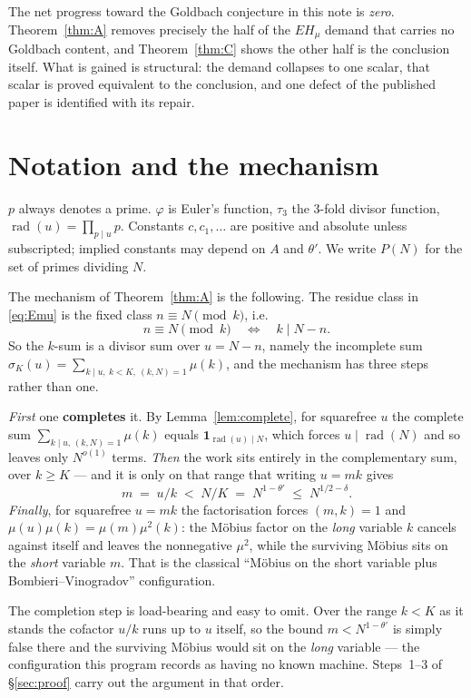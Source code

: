 \documentclass[11pt,a4paper]{article}
\theoremstyle{plain}
\theoremstyle{definition}
\DeclareMathOperator{\rad}{rad}
\begin{document}
The net progress toward the Goldbach conjecture in this note is
\emph{zero}. Theorem~\ref{thm:A} removes precisely the half of the
$EH_\mu$ demand that carries no Goldbach content, and
Theorem~\ref{thm:C} shows the other half is the conclusion itself. What
is gained is structural: the demand collapses to one scalar, that
scalar is proved equivalent to the conclusion, and one defect of the
published paper is identified with its repair.

\section{Notation and the mechanism}\label{sec:mechanism}

$p$ always denotes a prime. $\varphi$ is Euler's function, $\tau_3$ the
$3$-fold divisor function, $\rad(u)=\prod_{p\mid u}p$. Constants
$c,c_1,\dots$ are positive and absolute unless subscripted;
implied constants may depend on $A$ and $\theta'$. We write
$P(N)$ for the set of primes dividing $N$.

The mechanism of Theorem~\ref{thm:A} is the following. The residue class
in \eqref{eq:Emu} is the fixed class $n\equiv N\pmod k$, i.e.
\[
  n \equiv N \pmod{k}\quad\Longleftrightarrow\quad k \mid N-n .
\]
So the $k$-sum is a divisor sum over $u=N-n$, namely the incomplete sum
$\sigma_K(u)=\sum_{k\mid u,\ k<K,\ (k,N)=1}\mu(k)$, and the mechanism
has three steps rather than one.

\emph{First} one \textbf{completes} it. By Lemma~\ref{lem:complete}, for
squarefree $u$ the complete sum $\sum_{k\mid u,\,(k,N)=1}\mu(k)$ equals
$\mathbf 1_{\rad(u)\mid N}$, which forces $u\mid\rad(N)$ and so leaves
only $N^{o(1)}$ terms. \emph{Then} the work sits entirely in the
complementary sum, over $k\ge K$ --- and it is only on that range that
writing $u=mk$ gives
\[
  m \;=\; u/k \;<\; N/K \;=\; N^{1-\theta'} \;\le\; N^{1/2-\delta}.
\]
\emph{Finally}, for squarefree $u=mk$ the factorisation forces
$(m,k)=1$ and $\mu(u)\mu(k)=\mu(m)\mu^2(k)$: the M\"obius factor on the
\emph{long} variable $k$ cancels against itself and leaves the
nonnegative $\mu^2$, while the surviving M\"obius sits on the
\emph{short} variable $m$. That is the classical
``M\"obius on the short variable plus Bombieri--Vinogradov''
configuration.

The completion step is load-bearing and easy to omit. Over the range
$k<K$ as it stands the cofactor $u/k$ runs up to $u$ itself, so the
bound $m<N^{1-\theta'}$ is simply false there and the surviving
M\"obius would sit on the \emph{long} variable --- the configuration
this program records as having no known machine. Steps~1--3 of
\S\ref{sec:proof} carry out the argument in that order.
\end{document}
